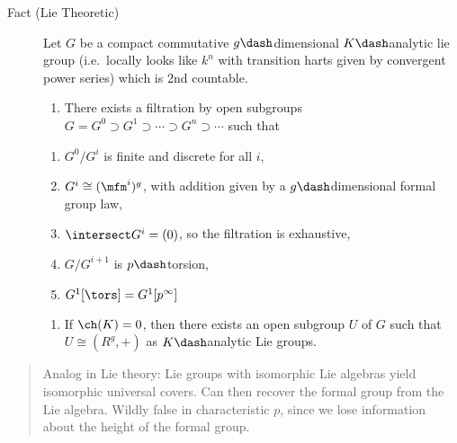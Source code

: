 \begin{description}
\item[Fact (Lie Theoretic)]
Let \(G\) be a compact commutative \(g\dash\)dimensional
\(K\dash\)analytic lie group (i.e.~locally looks like \(k^n\) with
transition harts given by convergent power series) which is 2nd
countable.

\begin{enumerate}
\def\labelenumi{\alph{enumi}.}
\tightlist
\item
  There exists a filtration by open subgroups
  \(G = G^0 \supset G^1 \supset \cdots \supset G^n \supset \cdots\) such
  that
\end{enumerate}

\begin{enumerate}
\def\labelenumi{\arabic{enumi}.}
\setcounter{enumi}{-1}
\tightlist
\item
  \(G^0/G^i\) is finite and discrete for all \(i\),
\item
  \(G^i \cong (\mfm^i)^g\), with addition given by a
  \(g\dash\)dimensional formal group law,
\item
  \(\intersect G^i = (0)\), so the filtration is exhaustive,
\item
  \(G/G^{i+1}\) is \(p\dash\)torsion,
\item
  \(G^1[\tors] = G^1[p^\infty]\)
\end{enumerate}

\begin{enumerate}
\def\labelenumi{\alph{enumi}.}
\setcounter{enumi}{1}
\tightlist
\item
  If \(\ch(K) = 0\), then there exists an open subgroup \(U\) of \(G\)
  such that \(U \cong (R^g, +)\) as \(K\dash\)analytic Lie groups.
\end{enumerate}
\end{description}

\begin{quote}
Analog in Lie theory: Lie groups with isomorphic Lie algebras yield
isomorphic universal covers. Can then recover the formal group from the
Lie algebra. Wildly false in characteristic \(p\), since we lose
information about the height of the formal group.
\end{quote}

